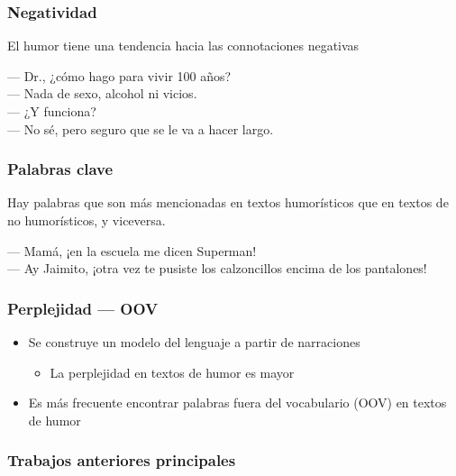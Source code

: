 \begin{frame}
    \frametitle{Negatividad}
    
    El humor tiene una tendencia hacia las connotaciones negativas

    \begin{example}
        --- Dr., ¿cómo hago para vivir 100 años? \\
        --- Nada de sexo, alcohol ni vicios. \\
        --- ¿Y funciona? \\
        --- No sé, pero seguro que se le va a hacer largo.
    \end{example}
\end{frame}

\begin{frame}
    \frametitle{Palabras clave}
    
    Hay palabras que son más mencionadas en textos humorísticos que en textos de no humorísticos, y viceversa.
    
    \begin{example}
        --- Mamá, ¡en la escuela me dicen Superman! \\
        --- Ay Jaimito, ¡otra vez te pusiste los calzoncillos encima de los pantalones!
    \end{example}
\end{frame}

\begin{frame}
    \frametitle{Perplejidad --- OOV}
    
    \begin{itemize}
        \item Se construye un modelo del lenguaje a partir de narraciones

        \begin{itemize}
            \item La perplejidad en textos de humor es mayor
        \end{itemize}

        \item Es más frecuente encontrar palabras fuera del vocabulario (OOV) en textos de humor
    \end{itemize}
\end{frame}

\subsubsection{Trabajos anteriores principales}


